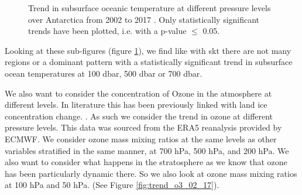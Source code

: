 \documentclass[../main.tex]{subfiles}
\begin{document}
\begin{figure}[hbt!]
\begin{subfigure}[b]{0.3\textwidth}
    \end{subfigure}
    \caption{Trend in subsurface oceanic temperature at different pressure levels over Antarctica from 2002 to 2017 . Only statistically significant trends have been plotted, i.e. with a p-value $\leq$ 0.05.}
    \label{fig:trend_subsurtemp_02_17}
\end{figure}

Looking at these sub-figures (figure \ref{fig:trend_subsurtemp_02_17}), we find like with \gls{skt} there are not many regions or a dominant pattern with a statistically significant trend in subsurface ocean temperatures at 100 dbar, 500 dbar or 700 dbar. 

We also want to consider the concentration of Ozone in the atmosphere at different levels. In literature this has been previously linked with land ice concentration change. . As such we consider the trend in ozone at different pressure levels. This data was sourced from the ERA5 reanalysis provided by ECMWF. We consider ozone mass mixing ratios at the same levels as other variables stratified  in the same manner, at 700 hPa, 500 hPa, and 200 hPa. We also want to consider what happens in the stratosphere as we know that ozone has been particularly dynamic there. So we also look at ozone mass mixing ratios at 100 hPa and 50 hPa. (See Figure \ref{fig:trend_o3_02_17}).
\end{document}
